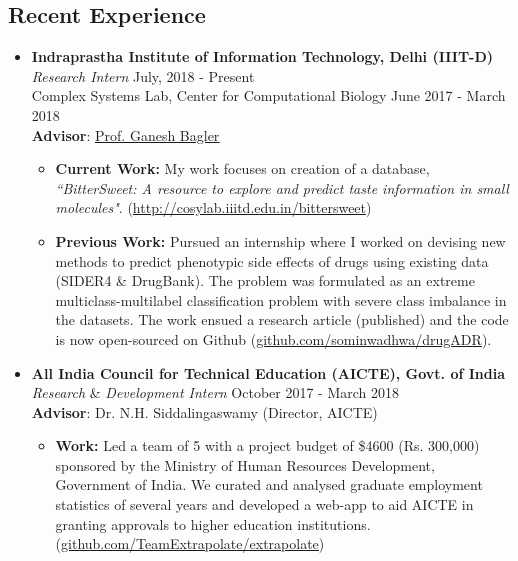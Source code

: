 \documentclass[margin,line]{res}
\begin{document}
\begin{resume}
\section{\sc Recent Experience}
\begin{itemize}[leftmargin=*]
\item {\bf Indraprastha Institute of Information Technology, Delhi (IIIT-D)}\\
\textit{Research Intern} \hfill July, 2018 - Present\\
Complex Systems Lab, Center for Computational Biology \hfill June 2017 - March 2018 \\  
{\bf Advisor}: {\href{https://scholar.google.co.in/citations?user=qyth_0QAAAAJ&hl=en}{\underline{Prof. Ganesh Bagler}}}
\begin{itemize}[leftmargin=*]
\item {\bf Current Work:} My work focuses on creation of a database, \textit{``BitterSweet: A resource to explore and predict taste information in small molecules"}. ({\href{http://cosylab.iiitd.edu.in/bittersweet/}{http://cosylab.iiitd.edu.in/bittersweet}})
\item {\bf Previous Work:} Pursued an internship where I worked on devising new methods to predict phenotypic side effects of drugs using existing data (SIDER4 \& DrugBank). The problem was formulated as an extreme multiclass-multilabel classification problem with severe class imbalance in the datasets. The work ensued a research article (published) and the code is now open-sourced on Github ({\href{https://github.com/sominwadhwa/drugADR}{github.com/sominwadhwa/drugADR}}).
\end{itemize}
\item {\bf All India Council for Technical Education (AICTE), Govt. of India}\\
\textit{Research} \& \textit{Development Intern} \hfill October 2017 - March 2018\\  
{\bf Advisor}: Dr. N.H. Siddalingaswamy (Director, AICTE)
\begin{itemize}[leftmargin=*]
\item {\bf Work:} Led a team of 5 with a project budget of \$4600 (Rs. 300,000) sponsored by the Ministry of Human Resources Development, Government of India. We curated and analysed graduate employment statistics of several years and developed a web-app to aid AICTE in granting approvals to higher education institutions. ({\href{https://github.com/TeamExtrapolate/extrapolate}{github.com/TeamExtrapolate/extrapolate}})
\end{itemize}
\end{itemize}


\end{resume}
\end{document}
